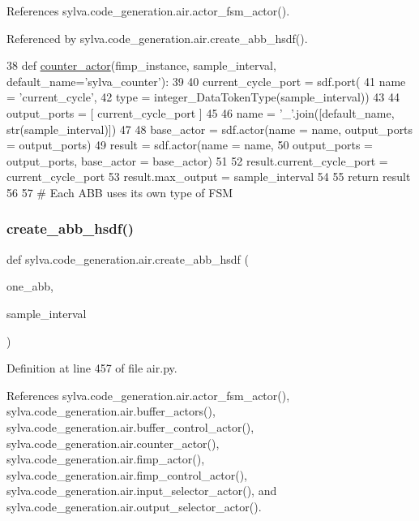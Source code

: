 References sylva.\+code\+\_\+generation.\+air.\+actor\+\_\+fsm\+\_\+actor().



Referenced by sylva.\+code\+\_\+generation.\+air.\+create\+\_\+abb\+\_\+hsdf().


\begin{DoxyCode}
38 \textcolor{keyword}{def }\hyperlink{namespacesylva_1_1code__generation_1_1air_a50394584613c57985bc89c8fa14a058f}{counter\_actor}(fimp\_instance, sample\_interval, default\_name='sylva\_counter'):
39 
40   current\_cycle\_port = sdf.port(
41     name = \textcolor{stringliteral}{'current\_cycle'},
42     type = integer\_DataTokenType(sample\_interval))
43 
44   output\_ports = [ current\_cycle\_port ]
45 
46   name = \textcolor{stringliteral}{'\_'}.join([default\_name, str(sample\_interval)])
47 
48   base\_actor = sdf.actor(name = name, output\_ports = output\_ports)
49   result = sdf.actor(name = name,
50     output\_ports = output\_ports, base\_actor = base\_actor)
51 
52   result.current\_cycle\_port = current\_cycle\_port
53   result.max\_output = sample\_interval
54 
55   \textcolor{keywordflow}{return} result
56 
57 \textcolor{comment}{# Each ABB uses its own type of FSM}
\end{DoxyCode}
\mbox{\label{namespacesylva_1_1code__generation_1_1air_a5a2588aa1c35ad4bd47d3b8f7eeca94a}} 
\subsubsection{\texorpdfstring{create\+\_\+abb\+\_\+hsdf()}{create\_abb\_hsdf()}}
{\footnotesize\ttfamily def sylva.\+code\+\_\+generation.\+air.\+create\+\_\+abb\+\_\+hsdf (\begin{DoxyParamCaption}\item[{}]{one\+\_\+abb,  }\item[{}]{sample\+\_\+interval }\end{DoxyParamCaption})}



Definition at line 457 of file air.\+py.



References sylva.\+code\+\_\+generation.\+air.\+actor\+\_\+fsm\+\_\+actor(), sylva.\+code\+\_\+generation.\+air.\+buffer\+\_\+actors(), sylva.\+code\+\_\+generation.\+air.\+buffer\+\_\+control\+\_\+actor(), sylva.\+code\+\_\+generation.\+air.\+counter\+\_\+actor(), sylva.\+code\+\_\+generation.\+air.\+fimp\+\_\+actor(), sylva.\+code\+\_\+generation.\+air.\+fimp\+\_\+control\+\_\+actor(), sylva.\+code\+\_\+generation.\+air.\+input\+\_\+selector\+\_\+actor(), and sylva.\+code\+\_\+generation.\+air.\+output\+\_\+selector\+\_\+actor().



